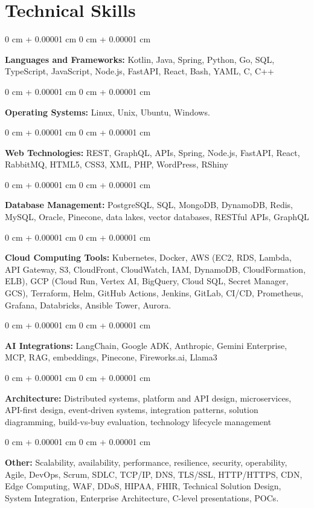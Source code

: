 \documentclass[10pt, letterpaper]{article}
\newenvironment{onecolentry}{
    \begin{adjustwidth}{
        0 cm + 0.00001 cm
    }{
        0 cm + 0.00001 cm
    }
}{
    \end{adjustwidth}
} %
\begin{document}
    \section{Technical Skills}
    \vspace{2 pt }
    \begin{onecolentry}
    \textbf{Languages and Frameworks:} Kotlin, Java, Spring, Python, Go, SQL, TypeScript, JavaScript, Node.js, FastAPI, React, Bash, YAML, C, C++
    \end{onecolentry}
    \begin{onecolentry}
        \textbf{Operating Systems:} Linux, Unix, Ubuntu, Windows.
    \end{onecolentry}
    \begin{onecolentry}
         \textbf{Web Technologies:} REST, GraphQL, APIs, Spring, Node.js, FastAPI, React, RabbitMQ, HTML5, CSS3, XML, PHP, WordPress, RShiny
    \end{onecolentry}
    \begin{onecolentry}
        \textbf{Database Management:} PostgreSQL, SQL, MongoDB, DynamoDB, Redis, MySQL, Oracle, Pinecone, data lakes, vector databases, RESTful APIs, GraphQL
    \end{onecolentry}
    \begin{onecolentry}
        \textbf{Cloud Computing Tools:}
Kubernetes, Docker, AWS (EC2, RDS, Lambda, API Gateway, S3, CloudFront, CloudWatch, IAM, DynamoDB, CloudFormation, ELB), GCP (Cloud Run, Vertex AI, BigQuery, Cloud SQL, Secret Manager, GCS), Terraform, Helm, GitHub Actions, Jenkins, GitLab, CI/CD, Prometheus, Grafana, Databricks, Ansible Tower, Aurora.
    \end{onecolentry}
    \begin{onecolentry}
         \textbf{AI Integrations:} LangChain, Google ADK, Anthropic, Gemini Enterprise, MCP, RAG, embeddings, Pinecone, Fireworks.ai, Llama3
    \end{onecolentry}
    \begin{onecolentry}
        \textbf{Architecture:} Distributed systems, platform and API design, microservices, API-first design, event-driven systems, integration patterns, solution diagramming, build-vs-buy evaluation, technology lifecycle management
    \end{onecolentry}
        \begin{onecolentry}
     \textbf{Other:} Scalability, availability, performance, resilience, security, operability, Agile, DevOps, Scrum, SDLC, TCP/IP, DNS, TLS/SSL, HTTP/HTTPS, CDN, Edge Computing, WAF, DDoS, HIPAA, FHIR, Technical Solution Design, System Integration, Enterprise Architecture, C-level presentations, POCs.
    \end{onecolentry}
\end{document}
